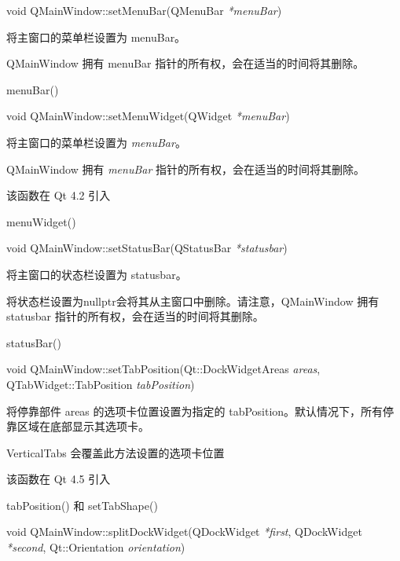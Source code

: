 \splitLine

void QMainWindow::setMenuBar(QMenuBar \emph{*menuBar})

将主窗口的菜单栏设置为 menuBar。

\begin{notice}
QMainWindow 拥有 menuBar 指针的所有权，会在适当的时间将其删除。\end{notice}

\begin{notice}[另请参阅]
menuBar()
\end{notice}

\splitLine

void QMainWindow::setMenuWidget(QWidget \emph{*menuBar})

将主窗口的菜单栏设置为 \emph{menuBar}。

QMainWindow 拥有 \emph{menuBar} 指针的所有权，会在适当的时间将其删除。

该函数在 Qt 4.2 引入

\begin{notice}[另请参阅]
menuWidget()
\end{notice}

\splitLine

void QMainWindow::setStatusBar(QStatusBar \emph{*statusbar})

将主窗口的状态栏设置为 statusbar。

将状态栏设置为nullptr会将其从主窗口中删除。请注意，QMainWindow 拥有 statusbar 指针的所有权，会在适当的时间将其删除。

\begin{notice}[另请参阅]
statusBar()
\end{notice}

\splitLine

void QMainWindow::setTabPosition(Qt::DockWidgetAreas \emph{areas}, QTabWidget::TabPosition \emph{tabPosition})

将停靠部件 areas 的选项卡位置设置为指定的 tabPosition。默认情况下，所有停靠区域在底部显示其选项卡。

\begin{notice}
VerticalTabs 会覆盖此方法设置的选项卡位置
\end{notice}

该函数在 Qt 4.5 引入

\begin{notice}[另请参阅]
tabPosition() 和 setTabShape()
\end{notice}

\splitLine

void QMainWindow::splitDockWidget(QDockWidget \emph{*first}, QDockWidget \emph{*second}, Qt::Orientation \emph{orientation})

